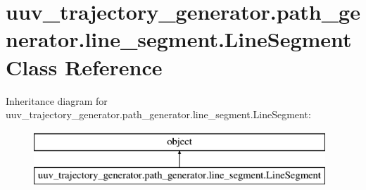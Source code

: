 \hypertarget{classuuv__trajectory__generator_1_1path__generator_1_1line__segment_1_1LineSegment}{}\section{uuv\+\_\+trajectory\+\_\+generator.\+path\+\_\+generator.\+line\+\_\+segment.\+Line\+Segment Class Reference}
\label{classuuv__trajectory__generator_1_1path__generator_1_1line__segment_1_1LineSegment}
Inheritance diagram for uuv\+\_\+trajectory\+\_\+generator.\+path\+\_\+generator.\+line\+\_\+segment.\+Line\+Segment\+:\begin{figure}[H]
\begin{center}
\leavevmode
\includegraphics[height=2.000000cm]{classuuv__trajectory__generator_1_1path__generator_1_1line__segment_1_1LineSegment}
\end{center}
\end{figure}
